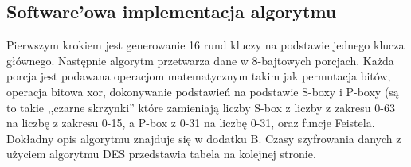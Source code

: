 \documentclass[oneside]{mgr}
\begin{document}
\subsection{Software'owa implementacja algorytmu}
Pierwszym krokiem jest generowanie 16 rund kluczy na podstawie jednego klucza głównego. Następnie algorytm przetwarza dane w 8-bajtowych porcjach. Każda porcja jest podawana operacjom matematycznym takim jak permutacja bitów, operacja bitowa xor, dokonywanie podstawień na podstawie S-boxy i P-boxy (są to takie ,,czarne skrzynki'' które zamieniają liczby S-box z liczby z zakresu 0-63 na liczbę z zakresu 0-15, a P-box z 0-31 na liczbę 0-31, oraz funcje Feistela.\\Dokładny opis algorytmu znajduje się w dodatku B. Czasy szyfrowania danych z użyciem algorytmu DES przedstawia tabela na kolejnej stronie.
\begin{table}


\end{table}
\end{document}
